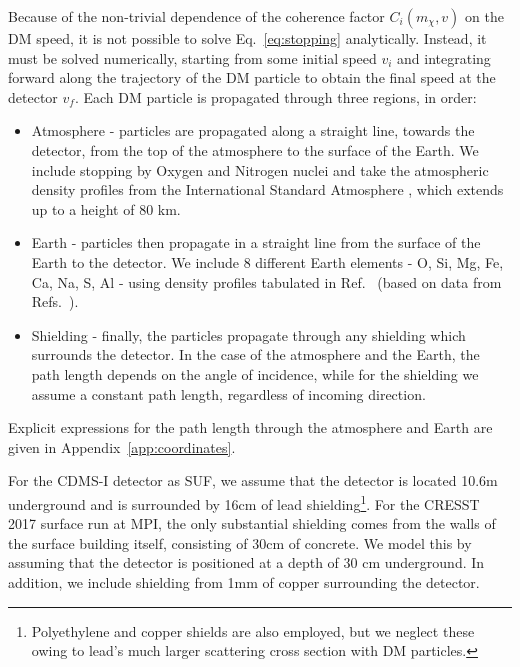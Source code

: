 \documentclass[prd,twocolumn,showpacs,nofootinbib,aps]{revtex4-1}
\begin{document}
Because of the non-trivial dependence of the coherence factor $C_i(m_\chi, v)$ on the DM speed, it is not possible to solve Eq.~\eqref{eq:stopping} analytically. Instead, it must be solved numerically, starting from some initial speed $v_i$ and integrating forward along the trajectory of the DM particle to obtain the final speed at the detector $v_f$. Each DM particle is propagated through three regions, in order:
\begin{itemize}
\item Atmosphere - particles are propagated along a straight line, towards the detector, from the top of the atmosphere to the surface of the Earth. We include stopping by Oxygen and Nitrogen nuclei and take the atmospheric density profiles from the International Standard Atmosphere \cite{ISA}, which extends up to a height of 80 km.
\item Earth - particles then propagate in a straight line from the surface of the Earth to the detector. We include 8 different Earth elements - O, Si, Mg, Fe, Ca, Na, S, Al - using density profiles tabulated in Ref.~\cite{Lundberg:2004dn} (based on data from Refs.~\cite{Geochemistry,Britannica}).
\item Shielding - finally, the particles propagate through any shielding which surrounds the detector. In the case of the atmosphere and the Earth, the path length depends on the angle of incidence, while for the shielding we assume a constant path length, regardless of incoming direction. 
\end{itemize}
Explicit expressions for the path length through the atmosphere and Earth are given in Appendix~\ref{app:coordinates}.

For the CDMS-I detector as SUF, we assume that the detector is located 10.6m underground and is surrounded by 16cm of lead shielding\footnote{Polyethylene and copper shields are also employed, but we neglect these owing to lead's much larger scattering cross section with DM particles.}. For the CRESST 2017 surface run at MPI, the only substantial shielding comes from the walls of the surface building itself, consisting of 30cm of concrete. We model this by assuming that the detector is positioned at a depth of 30 cm underground. In addition, we include shielding from 1mm of copper surrounding the detector.
\end{document}
